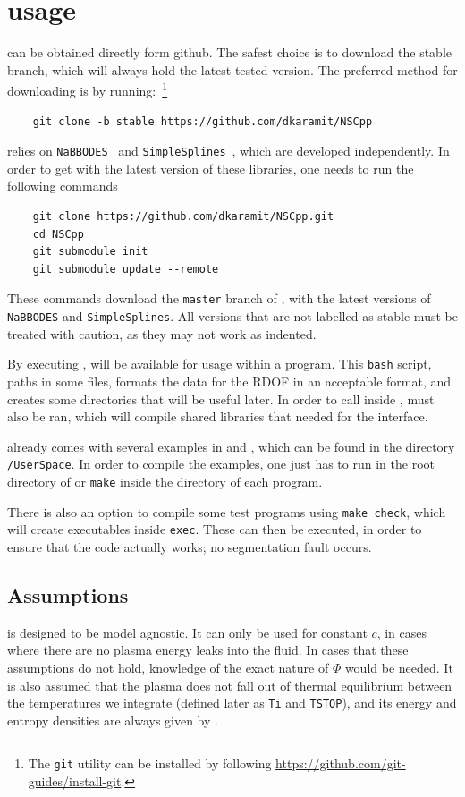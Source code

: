 \documentclass[11pt,a4paper]{article}
\begin{document}
\section{\nsc usage}\label{sec:first_steps}
\setcounter{equation}{0}
%
\nsc can be obtained directly form github. The safest choice is to download the stable branch, which will always hold the latest tested version. The preferred method for downloading \nsc is by running:~\footnote{The {\tt git} utility can be installed by following \href{https://github.com/git-guides/install-git}{https://github.com/git-guides/install-git}.}
%
\begin{lstlisting}
	git clone -b stable https://github.com/dkaramit/NSCpp
\end{lstlisting}

\nsc relies on {\tt NaBBODES}~\cite{NaBBODES} and {\tt SimpleSplines}~\cite{SimpleSplines}, which are developed independently. In order to get \nsc with the latest version of these libraries, one needs to run the following commands
%
\begin{lstlisting}
	git clone https://github.com/dkaramit/NSCpp.git
	cd NSCpp
	git submodule init
	git submodule update --remote
\end{lstlisting}
%
These commands download the {\tt master} branch of \nsc, with the latest versions of {\tt NaBBODES} and {\tt SimpleSplines}. All versions that are not labelled as stable must be treated with caution, as they may not work as indented. 

By executing , \nsc will be available for usage within a \CPP program. This {\tt bash} script, paths in some files, formats the data for the RDOF in an acceptable format, and creates some directories that will be useful later. In order to call \nsc inside \PY,  must also be ran,  which will compile shared libraries that needed for the \PY interface.

\nsc already comes with several examples in \CPP and \PY, which can be found in the directory {\tt \nsc/UserSpace}. In order to compile the \CPP examples, one just has to run  in the root directory of \nsc or {\tt make} inside the directory of each \CPP program.

There is also an option to compile some test programs using {\tt make check}, which will create executables inside {\tt exec}. These can then be executed, in order to ensure that the code actually works; \eg no segmentation fault occurs. 

\subsection{Assumptions}
%
\nsc is designed to be model agnostic. It can only be used for constant $c$, in cases where there are no plasma energy leaks into the fluid. In cases that these assumptions do not hold, knowledge of the exact nature of $\Phi$ would be needed.  It is also assumed that the plasma does not fall out of thermal equilibrium between the temperatures we integrate (defined later as {\tt Ti} and {\tt TSTOP}), and its energy and entropy densities are always given by .
\end{document}
